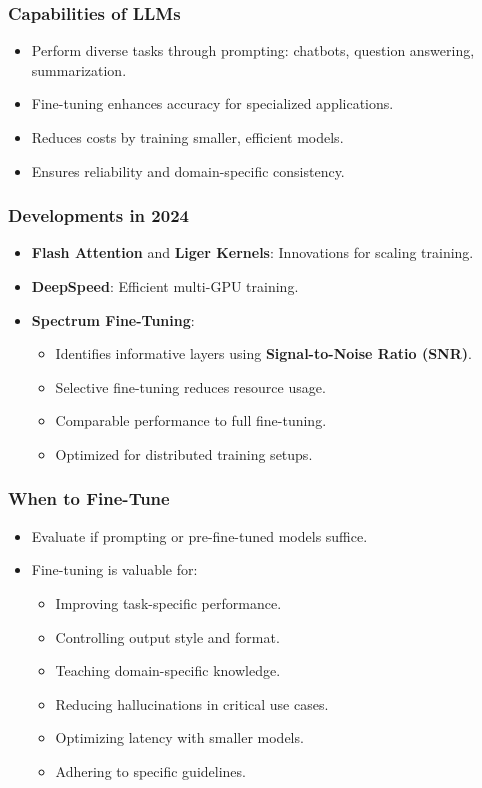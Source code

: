 \begin{frame}[fragile]\frametitle{Capabilities of LLMs}
    \begin{itemize}
        \item Perform diverse tasks through prompting: chatbots, question answering, summarization.
        \item Fine-tuning enhances accuracy for specialized applications.
        \item Reduces costs by training smaller, efficient models.
        \item Ensures reliability and domain-specific consistency.
    \end{itemize}
\end{frame}

\begin{frame}[fragile]\frametitle{Developments in 2024}
    \begin{itemize}
        \item \textbf{Flash Attention} and \textbf{Liger Kernels}: Innovations for scaling training.
        \item \textbf{DeepSpeed}: Efficient multi-GPU training.
		\item \textbf{Spectrum Fine-Tuning}:
		\begin{itemize}
			\item Identifies informative layers using \textbf{Signal-to-Noise Ratio (SNR)}.
			\item Selective fine-tuning reduces resource usage.
			\item Comparable performance to full fine-tuning.
			\item Optimized for distributed training setups.
		\end{itemize}
	\end{itemize}		
\end{frame}

\begin{frame}[fragile]\frametitle{When to Fine-Tune}
    \begin{itemize}
        \item Evaluate if prompting or pre-fine-tuned models suffice.
        \item Fine-tuning is valuable for:
        \begin{itemize}
            \item Improving task-specific performance.
            \item Controlling output style and format.
            \item Teaching domain-specific knowledge.
            \item Reducing hallucinations in critical use cases.
            \item Optimizing latency with smaller models.
            \item Adhering to specific guidelines.
        \end{itemize}
    \end{itemize}
\end{frame}


